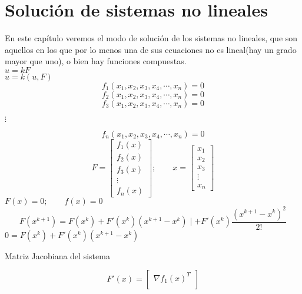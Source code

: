 \chapter{Soluci\'on de sistemas no lineales}
En este cap\'itulo veremos el modo de soluci\'on de los sistemas no lineales, que son aquellos en los que por lo menos una de sus ecuaciones no es lineal(hay un grado mayor que uno), o bien hay funciones compuestas.\\
$u=kF$\\
$u=k(u,F)$\\
\begin{displaymath}
f_1(x_1,x_2,x_3,x_4,\cdots, x_n)=0
\end{displaymath}
\begin{displaymath}
f_2(x_1,x_2,x_3,x_4,\cdots, x_n)=0
\end{displaymath}
\begin{displaymath}
f_3(x_1,x_2,x_3,x_4,\cdots, x_n)=0
\end{displaymath}
\begin{center}
$\vdots$
\end{center}
\begin{displaymath}
f_n(x_1,x_2,x_3,x_4,\cdots, x_n)=0
\end{displaymath}
\begin{displaymath}
F=\begin{bmatrix}
f_1(x)\\
f_2(x)\\
f_3(x)\\
\vdots \\
f_n(x)
\end{bmatrix}; \qquad x=\begin{bmatrix}
x_1\\
x_2\\
x_3\\
\vdots \\
x_n
\end{bmatrix}
\end{displaymath}
$F(x)=0; \qquad f(x)=0$\\
\begin{displaymath}
F(x^{k+1})=F(x^k)+F'(x^k)(x^{k+1}-x^k)\mid +F'(x^k)\frac{(x^{k+1}-x^k)^2}{2!}
\end{displaymath}
$0=F(x^k)+F'(x^k)(x^{k+1}-x^k)$\\
\begin{center}
Matriz Jacobiana del sistema
\end{center}
\begin{displaymath}
F'(x)=\begin{bmatrix}
\nabla f_1(x)^T \\
\end{bmatrix}
\end{displaymath}